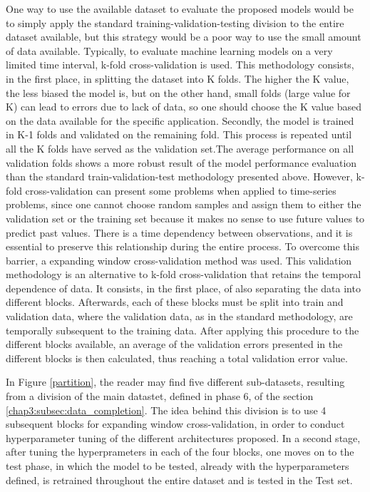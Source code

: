 One way to use the available dataset to evaluate the proposed models would be to simply apply the standard training-validation-testing division to the entire dataset available, but this strategy would be a poor way to use the small amount of data available. Typically, to evaluate machine learning models on a very limited time interval, k-fold cross-validation is used. This methodology consists, in the first place, in splitting the dataset into K folds. The higher the K value, the less biased the model is, but on the other hand, small folds (large value for K) can lead to errors due to lack of data, so one should choose the K value based on the data available for the specific application. Secondly, the model is trained in K-1 folds and validated on the remaining fold. This process is repeated until all the K folds have served as the validation set.The average performance on all validation folds shows a more robust result of the model performance evaluation than the standard train-validation-test methodology presented above. However, k-fold cross-validation can present some problems when applied to time-series problems, since one cannot choose random samples and assign them to either the validation set or the training set because it makes no sense to use future values to predict past values. There is a time dependency between observations, and it is essential to preserve this relationship during the entire process. To overcome this barrier, a expanding window cross-validation method was used. This validation methodology is an alternative to k-fold cross-validation that retains the temporal dependence of data. It consists, in the first place, of also separating the data into different blocks. Afterwards, each of these blocks must be split into train and validation data, where the validation data, as in the standard methodology, are temporally subsequent to the training data. After applying this procedure to the different blocks available, an average of the validation errors presented in the different blocks is then calculated, thus reaching a total validation error value. 

In Figure \ref{partition}, the reader may find five different sub-datasets, resulting from a division of the main datastet, defined in phase 6, of the section \ref{chap3:subsec:data_completion}. The idea behind this division is to use 4 subsequent blocks for expanding window cross-validation, in order to conduct hyperparameter tuning of the different architectures proposed. In a second stage, after tuning the hyperprameters in each of the four blocks, one moves on to the test phase, in which the model to be tested, already with the hyperparameters defined, is retrained throughout the entire dataset and is tested in the Test set.

